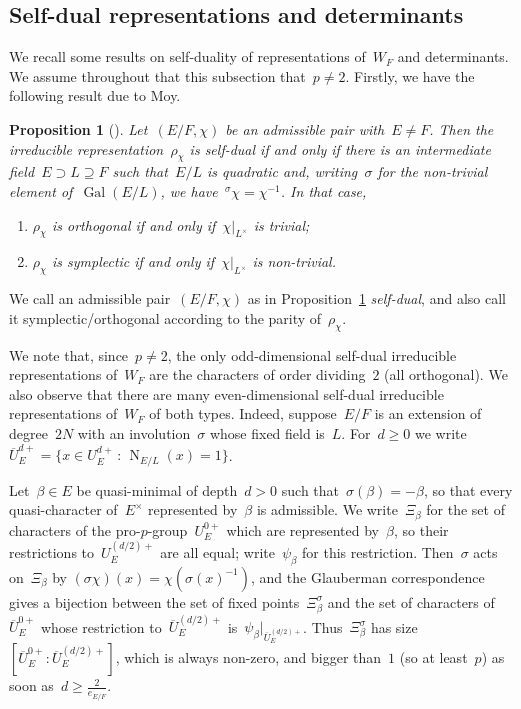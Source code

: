 \documentclass[12pt]{amsart}
\newcommand{\Gal}{\operatorname{Gal}}
\renewcommand{\mid}{\,:\,}
\newcommand{\N}{\operatorname{N}}
\newtheorem{prop}[thm]{Proposition}
\newtheorem{prop}[equation]{Proposition}
\begin{document}
\subsection{Self-dual representations and determinants}

We recall some results on self-duality of representations of~$W_F$ and determinants. We assume throughout that this subsection that~$p\ne 2$. Firstly, we have the following result due to Moy.

\begin{prop}[{\cite[Theorem~1]{M84}}]\label{prop:moy}
Let~$(E/F,\chi)$ be an admissible pair with~$E\ne F$. Then the irreducible representation~$\rho_\chi$ is self-dual if and only if there is an intermediate field~$E\supset L\supseteq F$ such that~$E/L$ is quadratic and, writing~$\sigma$ for the non-trivial element of~$\Gal(E/L)$, we have~${}^\sigma\chi=\chi^{-1}$. In that case,
\begin{enumerate}
\item\label{prop:moy.i} $\rho_\chi$ is orthogonal if and only if~$\chi|_{L^\times}$ is trivial;
\item\label{prop:moy.ii} $\rho_\chi$ is symplectic if and only if~$\chi|_{L^\times}$ is non-trivial.
\end{enumerate}
\end{prop}
We call an admissible pair~$(E/F,\chi)$ as in Proposition~\ref{prop:moy} \emph{self-dual}, and also call it symplectic/orthogonal according to the parity of~$\rho_\chi$.

We note that, since~$p\ne 2$, the only odd-dimensional self-dual irreducible representations of~$W_F$ are the characters of order dividing~$2$ (all orthogonal). We also observe that there are many even-dimensional self-dual irreducible representations of~$W_F$ of both types. Indeed, suppose~$E/F$ is an extension of degree~$2N$ with an involution~$\sigma$ whose fixed field is~$L$. For~$d\ge 0$ we write~$\overline U_E^{d+}=\{x\in U_E^{d+}\mid \N_{E/L}(x)=1\}$.

Let~$\beta\in E$ be quasi-minimal of depth~$d>0$ such that~$\sigma(\beta)=-\beta$, so that every quasi-character of~$E^\times$ represented by~$\beta$ is admissible. We write~$\Xi_\beta$ for the set of characters of the pro-$p$-group~$U_E^{0+}$ which are represented by~$\beta$, so their restrictions to~$U_E^{(d/2)+}$ are all equal; write~$\psi_\beta$ for this restriction. Then~$\sigma$ acts on~$\Xi_\beta$ by $(\sigma\chi)(x)=\chi(\sigma(x)^{-1})$, and the Glauberman correspondence gives a bijection between the set of fixed points~$\Xi_\beta^\sigma$ and the set of characters of~$\overline U_E^{0+}$ whose restriction to~$\overline U_E^{(d/2)+}$ is~$\psi_\beta|_{\overline U_E^{(d/2)+}}$. Thus~$\Xi_\beta^\sigma$ has size~$[\overline U_E^{0+}:\overline U_E^{(d/2)+}]$, which is always non-zero, and bigger than~$1$ (so at least~$p$) as soon as~$d\ge \frac 2{e_{E/F}}$.
\end{document}

